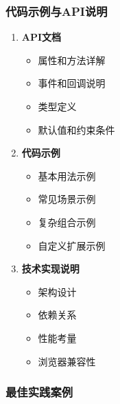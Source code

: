 \subsubsection{代码示例与API说明}\label{ux4ee3ux7801ux793aux4f8bux4e0eapiux8bf4ux660e}

\begin{enumerate}
\def\labelenumi{\arabic{enumi}.}
\tightlist
\item
  \textbf{API文档}

  \begin{itemize}
  \tightlist
  \item
    属性和方法详解
  \item
    事件和回调说明
  \item
    类型定义
  \item
    默认值和约束条件
  \end{itemize}
\item
  \textbf{代码示例}

  \begin{itemize}
  \tightlist
  \item
    基本用法示例
  \item
    常见场景示例
  \item
    复杂组合示例
  \item
    自定义扩展示例
  \end{itemize}
\item
  \textbf{技术实现说明}

  \begin{itemize}
  \tightlist
  \item
    架构设计
  \item
    依赖关系
  \item
    性能考量
  \item
    浏览器兼容性
  \end{itemize}
\end{enumerate}

\subsubsection{最佳实践案例}\label{ux6700ux4f73ux5b9eux8df5ux6848ux4f8b}

